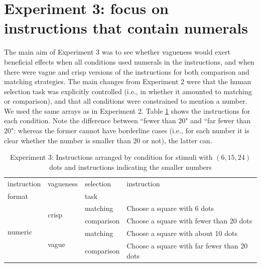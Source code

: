 \documentclass[%
man,		%
floatsintext,%
apacite%
]{apa6}
\begin{document}

\section{Experiment 3: focus on instructions that contain numerals}

The main aim of Experiment 3 was to see whether vagueness would exert beneficial effects when all conditions used numerals in the instructions, and when there were vague and crisp versions of the instructions for both comparison and matching strategies. The main changes from Experiment 2 were that the human selection task was explicitly controlled (i.e., in whether it amounted to matching or comparison), and that all conditions were constrained to mention a number. We used the same arrays as in Experiment 2. Table \ref{Instructions for e3} shows the instructions for each condition. Note the difference between ``fewer than 20" and ``far fewer than 20": whereas the former cannot have borderline cases (i.e., for each number it is clear whether the number is smaller than 20 or not), the latter can.


\begin{table}[htbp]
\centering
\caption{Experiment 3: Instructions arranged by condition for stimuli with $(6,15,24)$ dots and instructions indicating the smaller numbers} 
\label{Instructions for e3}
\begin{tabular}{llll}
instruction				&vagueness			&	selection		&	instruction							\\
format				&					&	task			&									\\
\toprule
\multirow{4}{*}{numeric}	&\multirow{2}{*}{crisp} 	&	matching		& Choose a square with 6 dots 				\\ 
					&					&	comparison 	& Choose a square with fewer than 20 dots 	\\
					\cline{2-4}
					&\multirow{2}{*}{vague} 	&	matching 		& Choose a square with about 10 dots 		\\ 
 					&					&	comparison 	& Choose a square with far fewer than 20 dots 	\\ 
\bottomrule
\end{tabular}
\end{table}%
\end{document}
